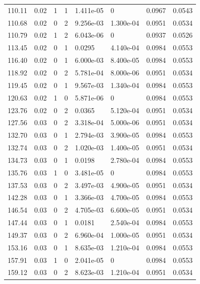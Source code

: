 \documentclass[preview]{standalone}
\begin{document}
{{{\begin{tabular}{L{1.2cm}C{1.2cm} C{0.3cm}C{0.5cm} C{1.4cm}C{1.4cm} C{1.4cm}C{1.4cm}}
  110.11  &  0.02  & 1     &  1 &  1.411e-05  & 0  & 0.0967 &  0.0543   \\ 
  110.68  &  0.02  & 0     &  2 &  9.256e-03  & 1.300e-04  & 0.0951 &  0.0534   \\ 
  110.79  &  0.02  & 1     &  2 &  6.043e-06  & 0  & 0.0937 &  0.0526   \\ 
  113.45  &  0.02  & 0     &  1 &  0.0295  & 4.140e-04  & 0.0984 &  0.0553   \\ 
  116.40  &  0.02  & 0     &  1 &  6.000e-03  & 8.400e-05  & 0.0984 &  0.0553   \\ 
  118.92  &  0.02  & 0     &  2 &  5.781e-04  & 8.000e-06  & 0.0951 &  0.0534   \\ 
  119.45  &  0.02  & 0     &  1 &  9.567e-03  & 1.340e-04  & 0.0984 &  0.0553   \\ 
  120.63  &  0.02  & 1     &  0 &  5.871e-06  & 0  & 0.0984 &  0.0553   \\ 
  123.76  &  0.02  & 0     &  2 &  0.0365  & 5.120e-04  & 0.0951 &  0.0534   \\ 
  127.56  &  0.03  & 0     &  2 &  3.318e-04  & 5.000e-06  & 0.0951 &  0.0534   \\ 
  132.70  &  0.03  & 0     &  1 &  2.794e-03  & 3.900e-05  & 0.0984 &  0.0553   \\ 
  132.74  &  0.03  & 0     &  2 &  1.020e-03  & 1.400e-05  & 0.0951 &  0.0534   \\ 
  134.73  &  0.03  & 0     &  1 &  0.0198  & 2.780e-04  & 0.0984 &  0.0553   \\ 
  135.76  &  0.03  & 1     &  0 &  3.481e-05  & 0  & 0.0984 &  0.0553   \\ 
  137.53  &  0.03  & 0     &  2 &  3.497e-03  & 4.900e-05  & 0.0951 &  0.0534   \\ 
  142.28  &  0.03  & 0     &  1 &  3.366e-03  & 4.700e-05  & 0.0984 &  0.0553   \\ 
  146.54  &  0.03  & 0     &  2 &  4.705e-03  & 6.600e-05  & 0.0951 &  0.0534   \\ 
  147.44  &  0.03  & 0     &  1 &  0.0181  & 2.540e-04  & 0.0984 &  0.0553   \\ 
  149.37  &  0.03  & 0     &  2 &  6.960e-04  & 1.000e-05  & 0.0951 &  0.0534   \\ 
  153.16  &  0.03  & 0     &  1 &  8.635e-03  & 1.210e-04  & 0.0984 &  0.0553   \\ 
  157.91  &  0.03  & 1     &  0 &  2.041e-05  & 0  & 0.0984 &  0.0553   \\ 
  159.12  &  0.03  & 0     &  2 &  8.623e-03  & 1.210e-04  & 0.0951 &  0.0534   \\ 

\end{tabular}}}}
\end{document}
